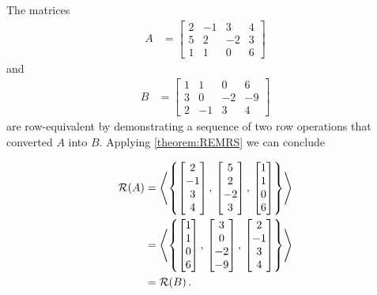 \documentclass{ximera}
\begin{document}
\begin{example}
  The matrices
  \begin{align*}
    A&=\begin{bmatrix}
      2&-1&3&4\\
      5&2&-2&3\\
      1&1&0&6
    \end{bmatrix}
  \end{align*}
  and
  \begin{align*}
    B&=\begin{bmatrix}
      1&1&0&6\\
      3&0&-2&-9\\
      2&-1&3&4
    \end{bmatrix}
  \end{align*}
  are row-equivalent by demonstrating a sequence of two row operations
  that converted $A$ into $B$.  Applying \ref{theorem:REMRS} we can
  conclude
  \begin{multipleChoice}
  \end{multipleChoice}
  
  \begin{feedback}
    \begin{align*}
      \mathcal{R}\!\left(A\right) &=
                \left\langle\left\{\begin{bmatrix}2\\-1\\3\\4\end{bmatrix},\,\begin{bmatrix}5\\2\\-2\\3\end{bmatrix},\,\begin{bmatrix}1\\1\\0\\6\end{bmatrix}\right\}\right\rangle \\
              &=\left\langle\left\{\begin{bmatrix}1\\1\\0\\6\end{bmatrix},\,\begin{bmatrix}3\\0\\-2\\-9\end{bmatrix},\,\begin{bmatrix}2\\-1\\3\\4\end{bmatrix}\right\}\right\rangle \\
              &=\mathcal{R}\!\left(B\right).
    \end{align*}    
  \end{feedback}

\end{example}
\end{document}
